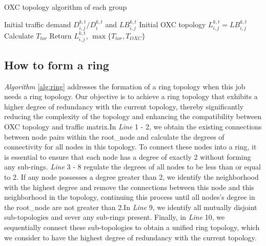 \documentclass[conference]{IEEEtran}
\begin{document}
\begin{algorithm}
	\caption{OXC topology algorithm of each group}
	\label{alg:count_topo}
	\LinesNumbered
	Initial traffic demand $D_{i,j}^{k,t}/D_i^{k,t}$ and $LB_{i,j}^{k,t}$\;
	Initial OXC topology $L_{i,j}^{k,t} = LB_{i,j}^{k,t}$\;
	Calculate $T_{tor}$\;
	Return $L_{i,j}^{k,t}$, $\max\{T_{tor},T_{OXC}\}$
\end{algorithm}

\subsection{How to form a ring}


\emph{Algorithm} \ref{alg:ring} addresses the formation of a ring topology when this job needs a ring topology. Our objective is to achieve a ring topology that exhibits a higher degree of redundancy with the current topology, thereby significantly reducing the complexity of the topology and enhancing the compatibility between OXC topology and traffic matrix.In \emph{Line} 1 - 2, we obtain the existing connections between node pairs within the root\_node and calculate the degrees of connectivity for all nodes in this topology. To connect these nodes into a ring, it is essential to ensure that each node has a degree of exactly 2 without forming any sub-rings. \emph{Line} 3 - 8 regulate the degrees of all nodes to be less than or equal to 2. If any node possesses a degree greater than 2, we identify the neighborhood with the highest degree and remove the connections between this node and this neighborhood in the topology, continuing this process until all nodes's degree in the root\_node are not greater than 2.In \emph{Line} 9, we identify all mutually disjoint sub-topologies and sever any sub-rings present. Finally, in \emph{Line} 10, we sequentially connect these sub-topologies to obtain a unified ring topology, which we consider to have the highest degree of redundancy with the current topology.
\end{document}

